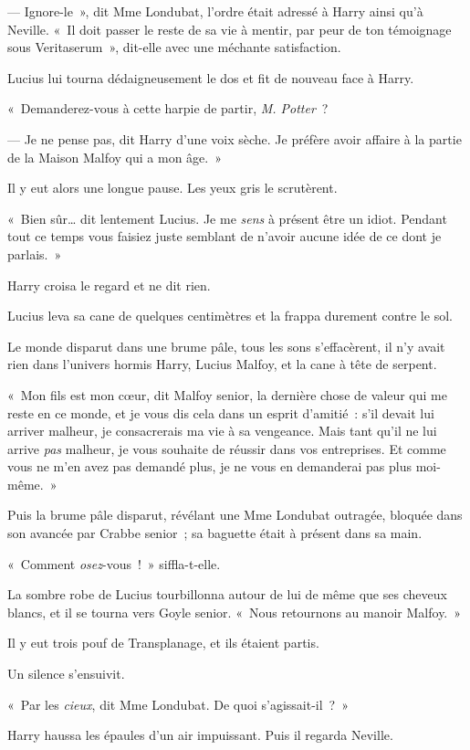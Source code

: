 --- Ignore-le~», dit Mme Londubat, l'ordre était adressé à Harry ainsi qu'à Neville. «~Il doit passer le reste de sa vie à mentir, par peur de ton témoignage sous Veritaserum~», dit-elle avec une méchante satisfaction.

Lucius lui tourna dédaigneusement le dos et fit de nouveau face à Harry.

«~Demanderez-vous à cette harpie de partir, \emph{M. Potter}~?

--- Je ne pense pas, dit Harry d'une voix sèche. Je préfère avoir affaire à la partie de la Maison Malfoy qui a mon âge.~»

Il y eut alors une longue pause. Les yeux gris le scrutèrent.

«~Bien sûr… dit lentement Lucius. Je me \emph{sens} à présent être un idiot. Pendant tout ce temps vous faisiez juste semblant de n'avoir aucune idée de ce dont je parlais.~»

Harry croisa le regard et ne dit rien.

Lucius leva sa cane de quelques centimètres et la frappa durement contre le sol.

Le monde disparut dans une brume pâle, tous les sons s'effacèrent, il n'y avait rien dans l'univers hormis Harry, Lucius Malfoy, et la cane à tête de serpent.

«~Mon fils est mon cœur, dit Malfoy senior, la dernière chose de valeur qui me reste en ce monde, et je vous dis cela dans un esprit d'amitié~: s'il devait lui arriver malheur, je consacrerais ma vie à sa vengeance. Mais tant qu'il ne lui arrive \emph{pas} malheur, je vous souhaite de réussir dans vos entreprises. Et comme vous ne m'en avez pas demandé plus, je ne vous en demanderai pas plus moi-même.~»

Puis la brume pâle disparut, révélant une Mme Londubat outragée, bloquée dans son avancée par Crabbe senior~; sa baguette était à présent dans sa main.

«~Comment \emph{osez}-vous~!~» siffla-t-elle.

La sombre robe de Lucius tourbillonna autour de lui de même que ses cheveux blancs, et il se tourna vers Goyle senior. «~Nous retournons au manoir Malfoy.~»

Il y eut trois pouf de Transplanage, et ils étaient partis.

Un silence s'ensuivit.

«~Par les \emph{cieux}, dit Mme Londubat. De quoi s'agissait-il~?~»

Harry haussa les épaules d'un air impuissant. Puis il regarda Neville.

